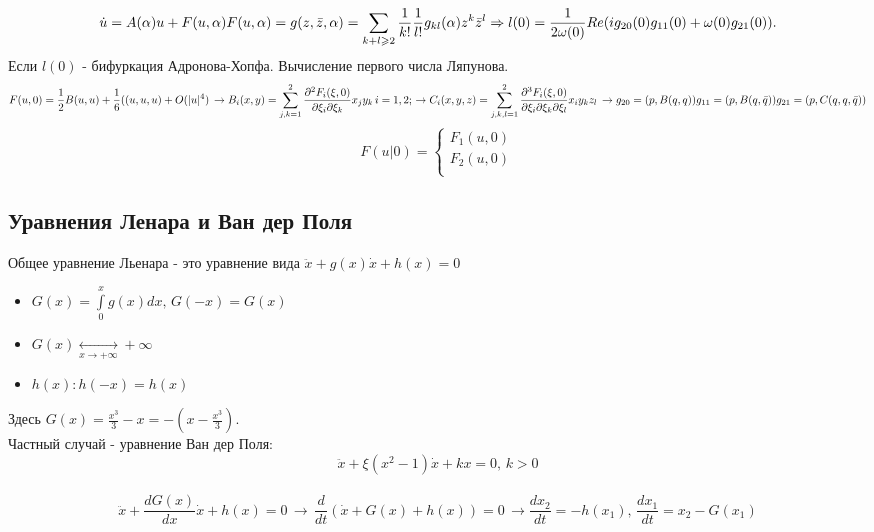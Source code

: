 \[
\dot{u} = A(\alpha) u + F(u,\alpha) \\
F(u,\alpha) = g(z, \bar{z},\alpha) = \sum\limits_{k+l \geqslant 2} \frac{1}{k!}\frac{1}{l!}g_{kl}(\alpha) z^k\bar{z}^l \\
\Rightarrow l(0) = \frac{1}{2\omega(0)}Re(ig_{20}(0)g_{11}(0)+\omega(0)g_{21}(0)).   
\]
Если $l(0)$ - бифуркация Адронова-Хопфа.
Вычисление первого числа Ляпунова.
\[
F(u,0) = \frac{1}{2}B(u,u)+\frac{1}{6}((u,u,u)+O(|u|^4) \, \rightarrow \\
B_i(x,y) = \sum\limits_{j,k=1}^2 \frac{\partial^2F_i(\xi,0)}{\partial \xi_i \partial \xi_k}x_j y_k \, i = 1,2; \, \rightarrow \\
C_i(x,y,z) = \sum\limits_{j,k,l=1}^2 \frac{\partial^3 F_i(\xi,0)}{\partial \xi_i \partial \xi_k \partial \xi_l}x_i y_k z_l \, \rightarrow \\
g_{20} = (p,B(q,q)) \\
g_{11} = (p, B(q, \bar{q})) \\
g_{21} = (p, C(q,q,\bar{q})) \\
\]
\[
F(u|0) = 
\begin{cases}
F_1(u,0) \\
F_2(u,0) \\
\end{cases}
\]


\subsection{Уравнения Ленара и Ван дер Поля}
Общее уравнение Льенара - это уравнение вида $\ddot{x}+g(x)\dot{x}+h(x)=0$
\begin{itemize}
	\item $G(x) = \int\limits_{0}^{x}g(x)dx, \, G(-x)=G(x) $
	\item $G(x) \underset{x \to +\infty}{\longleftrightarrow} +\infty $
	\item $h(x): h(-x) = h(x) $		
\end{itemize}
Здесь $G(x)=\frac{x^3}{3}-x=-(x-\frac{x^3}{3})$. \\
Частный случай - уравнение Ван дер Поля:
\[
	\ddot{x} + \xi(x^2-1)\dot{x}+kx=0, \, k>0
\] \\
\[
	\ddot{x}+\frac{dG(x)}{dx}\dot{x}+h(x)=0 \, \to \, \frac{d}{dt}(\dot{x}+G(x)+h(x)) = 0 \, \to
	\frac{dx_2}{dt}=-h(x_1), \, \frac{dx_1}{dt}=x_2-G(x_1)  
\]

